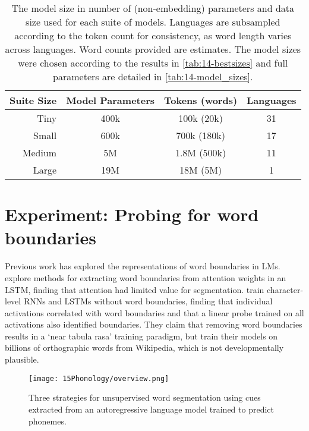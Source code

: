 \setlength{\tabcolsep}{2pt}
\begin{table}[t]
    \centering
    \small
    \begin{tabular}{rccc}
    \toprule
        Suite Size & Model Parameters & Tokens (words) & Languages \\
       \midrule
       Tiny & 400k & 100k (20k) & 31 \\
       Small & 600k & 700k (180k) & 17 \\
       Medium & 5M & 1.8M (500k) & 11 \\
       Large & 19M & 18M (5M) & 1 \\
       \bottomrule
    \end{tabular}
    \caption{The model size in number of (non-embedding) parameters and data size used for each suite of models. Languages are subsampled according to the token count for consistency, as word length varies across languages. Word counts provided are estimates. The model sizes were chosen according to the results in \cref{tab:14-bestsizes} and full parameters are detailed in \cref{tab:14-model_sizes}.}
    \label{tab:15-suites}
\end{table}

\section{Experiment: Probing for word boundaries}\label{sec:15-wordseg}

Previous work has explored the representations of word boundaries in LMs. \citet{sanabria2021difficulty} explore methods for extracting word boundaries from attention weights in an LSTM, finding that attention had limited value for segmentation. \citet{hahn-baroni-2019-tabula} train character-level RNNs and LSTMs without word boundaries, finding that individual activations correlated with word boundaries and that a linear probe trained on all activations also identified boundaries. They claim that removing word boundaries results in a `near tabula rasa' training paradigm, but train their models on billions of orthographic words from Wikipedia, which is not developmentally plausible.  %

\begin{figure}[t]
    \centering
    \texttt{[image: 15Phonology/overview.png]}
    \caption{Three strategies for unsupervised word segmentation using cues extracted from an autoregressive language model trained to predict phonemes.}
    \label{fig:15-example}
\end{figure}

